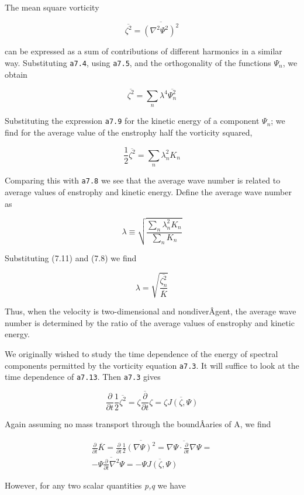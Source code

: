 The mean square vorticity

\[\overline{\zeta^2} = \overline{(\nabla^{2}\Psi^{2} )^2}\]

can be expressed as a sum of contributions of different harmonics in a
similar way. Substituting \texttt{a7.4}, using \texttt{a7.5}, and the
orthogonality of the functions \(\Psi_{n}\), we obtain

{\[\overline{\zeta^2} = \sum_{n}\lambda^{4}\overline{\Psi_n^2}\]}

Substituting the expression \texttt{a7.9} for the kinetic energy of a
component \(\Psi_{n}\); we find for the average value of the enstrophy
half the vorticity squared,

{\[\frac{1}{2}\overline{\zeta^{2}} = \sum_{n}\lambda_n^2 K_{n}\]}

Comparing this with \texttt{a7.8} we see that the average wave number is
related to average values of enstrophy and kinetic energy. Define the
average wave number as

{\[\lambda \equiv \sqrt{ \frac{\sum_n\lambda_n^2 K_n} {\sum_n K_n} }\]}

Substituting (7.11) and (7.8) we find

{\[\lambda = \sqrt{ \frac{\overline{\zeta_n^2} }{\overline{K}}  }\]}

Thus, when the velocity is two-dimensional and nondiverÂ­gent, the
average wave number is determined by the ratio of the average values of
enstrophy and kinetic energy.

We originally wished to study the time dependence of the energy of
spectral components permitted by the vorticity equation \texttt{a7.3}.
It will suffice to look at the time dependence of \texttt{a7.13}. Then
\texttt{a7.3} gives

{\[\frac{\partial}{\partial t} \frac{1}{2} \overline{\zeta^2} =
\overline{\zeta \frac{\partial}{\partial t} \zeta } =
\overline{\zeta J(\zeta,\Psi)}\]}

Again assuming no mass transport through the boundÂ­aries of A, we find

{\[\begin{aligned}
\frac{\partial}{\partial t} \overline{K} =
\frac{\partial}{\partial t} \frac{1}{2} \overline{(\nabla\Psi)^2} =
\overline{\nabla\Psi \cdot \frac{\partial}{\partial t}\nabla\Psi} =\\
-\overline{\Psi\frac{\partial}{\partial t} \nabla^2\Psi} =
-\overline{\Psi J(\zeta,\Psi)}
\end{aligned}\]}

However, for any two scalar quantities \emph{p,q} we have

